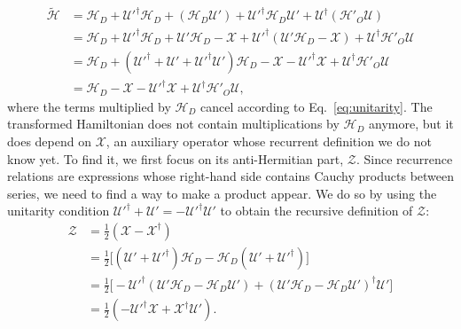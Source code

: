 %
\begin{equation}
\label{eq:H_tilde}
\begin{aligned}
  \tilde{\mathcal{H}}
  &= \mathcal{H}_{D} + \mathcal{U}'^\dagger \mathcal{H}_{D} + (\mathcal{H}_{D} \mathcal{U}') + \mathcal{U}'^\dagger \mathcal{H}_{D}
  \mathcal{U}' + \mathcal{U}^\dagger(\mathcal{H}'_{O}\mathcal{U})
  \\
  &= \mathcal{H}_{D} + \mathcal{U}'^\dagger \mathcal{H}_{D} + \mathcal{U}'\mathcal{H}_{D} - \mathcal{X} + \mathcal{U}'^\dagger (\mathcal{U}' \mathcal{H}_{D} - \mathcal{X}) + \mathcal{U}^\dagger\mathcal{H}'_{O}\mathcal{U} \\
  &= \mathcal{H}_{D} + (\mathcal{U}'^\dagger + \mathcal{U}' + \mathcal{U}'^\dagger \mathcal{U}')\mathcal{H}_{D} - \mathcal{X} - \mathcal{U}'^\dagger \mathcal{X} + \mathcal{U}^\dagger\mathcal{H}'_{O}\mathcal{U} \\
  &= \mathcal{H}_{D} - \mathcal{X} - \mathcal{U}'^\dagger \mathcal{X} + \mathcal{U}^\dagger\mathcal{H}'_{O}\mathcal{U},
\end{aligned}
\end{equation}
%
where the terms multiplied by $\mathcal{H}_{D}$ cancel according to Eq.~\eqref{eq:unitarity}.
The transformed Hamiltonian does not contain multiplications by $\mathcal{H}_{D}$ anymore, but it does depend on $\mathcal{X}$, an auxiliary operator whose recurrent definition we do not know yet.
To find it, we first focus on its anti-Hermitian part, $\mathcal{Z}$.
Since recurrence relations are expressions whose right-hand side contains Cauchy products between series, we need to find a way to make a product appear.
We do so by using the unitarity condition $\mathcal{U}'^\dagger + \mathcal{U}' = -\mathcal{U}'^\dagger \mathcal{U}'$ to obtain the recursive definition of $\mathcal{Z}$:
%
\begin{equation}
\label{eq:Z}
\begin{aligned}
\mathcal{Z}
&= \frac{1}{2} (\mathcal{X} - \mathcal{X}^{\dagger}) \\
&= \frac{1}{2}\Big[ (\mathcal{U}' + \mathcal{U}'^{\dagger}) \mathcal{H}_{D} - \mathcal{H}_{D} (\mathcal{U}' + \mathcal{U}'^{\dagger}) \Big] \\
&= \frac{1}{2} \Big[ - \mathcal{U}'^{\dagger} (\mathcal{U}'\mathcal{H}_{D} - \mathcal{H}_{D} \mathcal{U}') + (\mathcal{U}'\mathcal{H}_{D} - \mathcal{H}_{D} \mathcal{U}')^{\dagger} \mathcal{U}' \Big] \\
&= \frac{1}{2} (-\mathcal{U}'^{\dagger} \mathcal{X} + \mathcal{X}^{\dagger} \mathcal{U}').
\end{aligned}
\end{equation}

